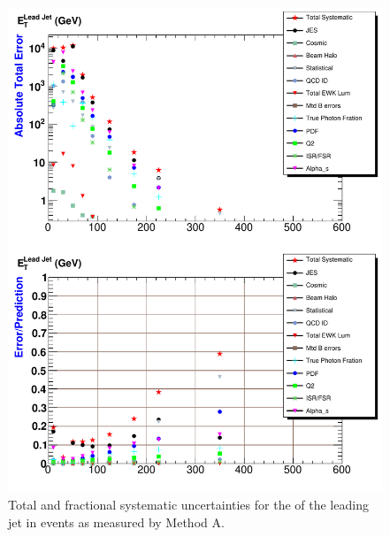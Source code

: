 \begin{figure}[p]
 \centering
 \includegraphics[scale=.7,keepaspectratio=true]{./G30Jets_Errs_MtdA_plot1_Et_j1.pdf}
 \caption{Total and fractional systematic uncertainties for the \et of the leading jet in \phoonejet events as measured by Method A.}
 \label{fig:g30Jets_Errs_MtdA_plot1_Et_jet}
\end{figure}

